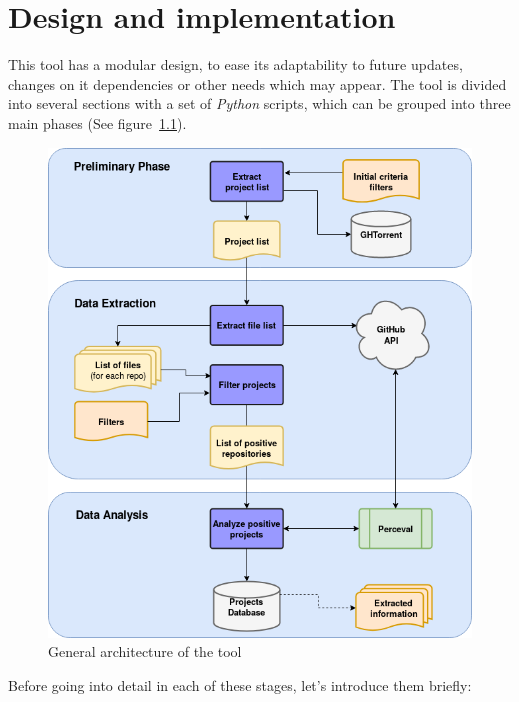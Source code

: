 \documentclass[a4paper, 12pt]{book}
\begin{document}
\chapter{Design and implementation}
\label{sec:arquitectura}
This tool has a modular design, to ease its adaptability to future updates, changes on it dependencies or other needs which may appear.
The tool is divided into several sections with a set of \emph{Python} scripts, which can be grouped into three
main phases (See figure~\ref{fig:arquitectura}).
\begin{figure}
  \centering
  \includegraphics[width=12cm, keepaspectratio]{img/generic-tool-diagram-sections}
  \caption{General architecture of the tool}
  \label{fig:arquitectura}
\end{figure}
Before going into detail in each of these stages, let's introduce them briefly:
\end{document}
